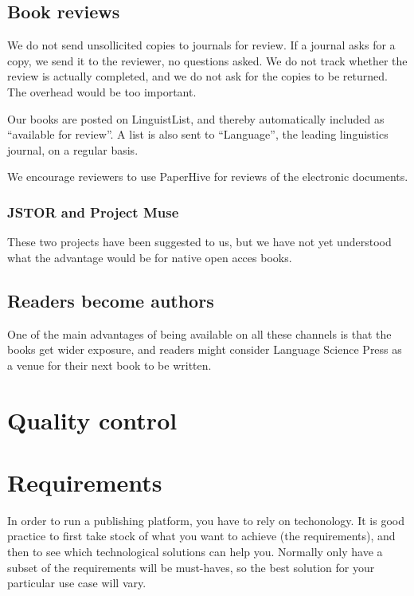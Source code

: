 \documentclass[guidelines,nonflat,modfonts] {langsci/langscibook}
\begin{document}
\subsection{Book reviews}
We do not send unsollicited copies to journals for review. If a journal asks for a copy, we send it to the reviewer, no questions asked. We do not track whether the review is actually completed, and we do not ask for the copies to be returned. The overhead would be too important. 

Our books are posted on LinguistList, and thereby automatically included as ``available for review''. A list is also sent to ``Language'', the leading linguistics journal, on a regular basis. 

We encourage reviewers to use PaperHive for reviews of the electronic documents.

                      
\subsubsection{JSTOR and Project Muse}                      
These two projects have been suggested to us, but we have not yet understood what the advantage would be for native open acces books.


\subsection{Readers become authors}
One of the main advantages of being available on all these channels is that the books get wider exposure, and readers might consider Language Science Press as a venue for their next book to be written. %

\section{Quality control}
                    
                    
\section{Requirements}
In order to run a publishing platform, you have to rely on techonology. It is good practice to first take stock of what you want to achieve (the requirements), and then to see which technological solutions can help you. Normally only have a subset of the requirements will be must-haves, so the best solution for your particular use case will vary.
\end{document}
